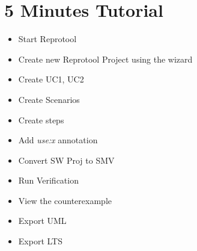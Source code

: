 \section{5 Minutes Tutorial}

\begin{itemize}
 \item Start Reprotool
 \item Create new Reprotool Project using the wizard
 \item Create UC1, UC2
 \item Create Scenarios
 \item Create steps
 \item Add \emph{use:x} annotation
 \item Convert SW Proj to SMV
 \item Run Verification
 \item View the counterexample
 \item Export UML
 \item Export LTS
\end{itemize}
